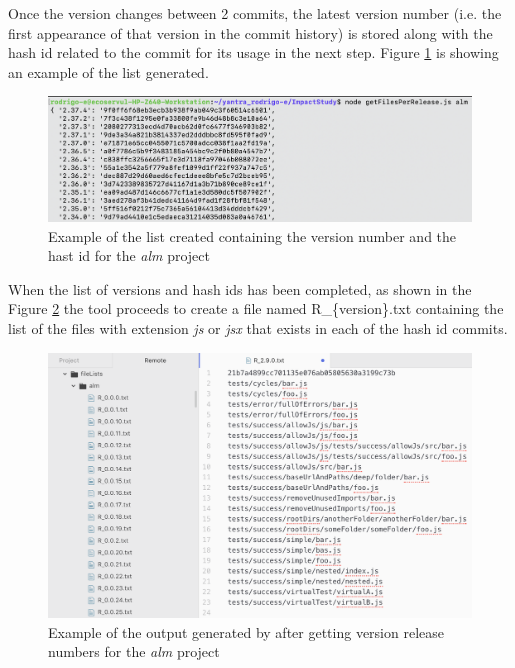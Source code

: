 Once the version changes between 2 commits, the latest version number (i.e. the first appearance of that version in the commit history) is stored along with the hash id related to the commit for its usage in the next step. Figure \ref{fig:listExample} is showing an example of the list generated.

\begin{figure}[ht!]
\centering
\includegraphics[width=1\textwidth]{images/list_example.png}
\caption{Example of the list created containing the version number and the hast id for the \textit{alm} project}
\label{fig:listExample}
\end{figure}

When the list of versions and hash ids has been completed, as shown in the Figure \ref{fig:fileListExample} the tool proceeds to create a file named R\_\{version\}.txt containing the list of the files with extension \textit{js} or \textit{jsx} that exists in each of the hash id commits.

\begin{figure}[ht!]
\centering
\includegraphics[width=1\textwidth]{images/file_list_example.png}
\caption{Example of the output generated by \tool[] after getting version release numbers for the \textit{alm} project}
\label{fig:fileListExample}
\end{figure}

